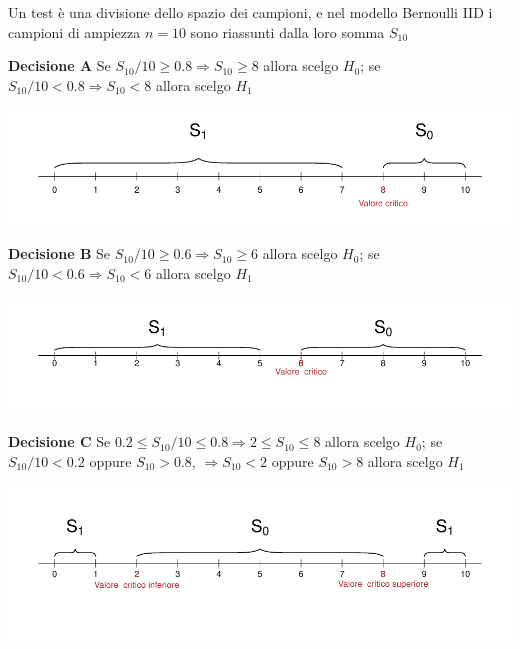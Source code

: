 \documentclass[
  11pt,
]{book}
\theoremstyle{mytheoremstyle}
\theoremstyle{mydefstyle}
\begin{document}
Un test è una divisione dello spazio dei campioni, e nel modello Bernoulli IID i campioni di ampiezza \(n=10\) sono riassunti dalla loro somma \(S_{10}\)

\textbf{Decisione A} Se \(S_{10}/10\geq 0.8\Rightarrow S_{10}\geq 8\) allora scelgo \(H_0\); se \(S_{10}/10 <   0.8\Rightarrow S_{10}<    8\) allora scelgo \(H_1\)

\begin{center}\includegraphics{Appunti_di_Statistica_2025_files/figure-latex/14-test-intro-16-1} \end{center}

\textbf{Decisione B} Se \(S_{10}/10\geq 0.6\Rightarrow S_{10}\geq 6\) allora scelgo \(H_0\); se \(S_{10}/10 <   0.6\Rightarrow S_{10}<    6\) allora scelgo \(H_1\)

\begin{center}\includegraphics{Appunti_di_Statistica_2025_files/figure-latex/14-test-intro-17-1} \end{center}

\textbf{Decisione C} Se \(0.2\leq S_{10}/10\leq 0.8\Rightarrow 2\leq S_{10}\leq 8\) allora scelgo \(H_0\); se \(S_{10}/10 <   0.2\) oppure \(S_{10}>0.8\), \(\Rightarrow S_{10}<  2\) oppure \(S_{10}>8\) allora scelgo \(H_1\)

\begin{center}\includegraphics{Appunti_di_Statistica_2025_files/figure-latex/14-test-intro-18-1} \end{center}
\end{document}
